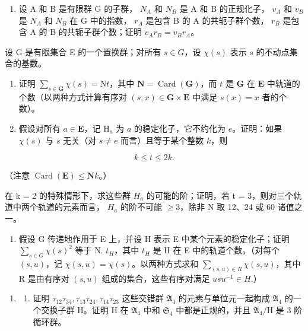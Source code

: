 \begin{enumerate}
\def\labelenumi{\arabic{enumi}。}
\setcounter{enumi}{7}
\tightlist
\item
  设 A 和 B 是有限群 G 的子群， \(N_{A}\) 和 \(N_{B}\) 是 A 和 B 的正规化子， \(v_{A}\) 和 \(v_{B}\) 是 \(N_{A}\) 和 \(N_{B}\) 在 G 中的指数， \(r_{A}\) 是包含 B 的 A 的共轭子群个数， \(r_{B}\) 是包含 A 的 B 的共轭子群个数；证明 \(v_{A}r_{B} = v_{B}r_{A}\)。
\end{enumerate}

设 G 是有限集合 E 的一个置换群；对所有 \(s \in G\)，设 \(\chi(s)\) 表示 \(s\) 的不动点集合的基数。

\begin{enumerate}
\def\labelenumi{(\alph{enumi})}
\item
  证明 \(\sum_{s\in \mathbf{G}}\chi (s) = \mathrm{N}t\)，其中 \(\mathbf{N} = \operatorname {Card}(\mathbf{G})\)，而 \(t\) 是 \(\mathbf{G}\) 在 \(\mathbf{E}\) 中轨道的个数（以两种方式计算有序对 \((s,x)\in \mathbf{G}\times \mathbf{E}\) 中满足 \(s(x) = x\) 者的个数）。
\item
  假设对所有 \(a \in \mathbf{E}\)，记 \(\mathrm{H}_a\) 为 \(a\) 的稳定化子，它不约化为 \(e\)。证明：如果 \(\chi(s)\) 与 \(s\) 无关（对 \(s \neq e\) 而言）且等于某个整数 \(k\)，则
\end{enumerate}

\[
k \leqslant t \leqslant 2 k.
\]

（注意 \(\operatorname{Card}(\mathbf{E}) \leqslant \mathbf{N}k\)。）

在 k = 2 的特殊情形下，求这些群 \(H_{a}\) 的可能的阶；证明，若 t = 3，则对三个轨道中两个轨道的元素而言， \(H_{a}\) 的阶不可能 \(\geqslant 3\)，除非 N 取 12、24 或 60 诸值之一。

\begin{enumerate}
\def\labelenumi{(\alph{enumi})}
\setcounter{enumi}{2}
\tightlist
\item
  假设 G 传递地作用于 E 上，并设 H 表示 E 中某个元素的稳定化子；证明 \(\sum_{s\in G}\chi(s)^{2}\) 等于 N. \(t_{H}\)，其中 \(t_{H}\) 是 H 在 E 中的轨道个数。（对每个 \((s,u)\)，记 \(\chi(s,u)=\chi(s)\)。以两种方式求和 \(\sum_{(s,u)\in R}\chi(s,u)\)，其中 R 是由有序对 \((s,u)\) 组成的集合，这些有序对满足 \(usu^{-1}\in H.\)）
\end{enumerate}

\begin{enumerate}
\def\labelenumi{\arabic{enumi}。}
\setcounter{enumi}{9}
\tightlist
\item
  \begin{enumerate}
  \def\labelenumii{(\alph{enumii})}
  \tightlist
  \item
    证明 \(\tau_{12}\tau_{34},\tau_{13}\tau_{24},\tau_{14}\tau_{23}\) 这些交错群 \(\mathfrak{A}_4\) 的元素与单位元一起构成 \(\mathfrak{A}_4\) 的一个交换子群 H。证明 H 在 \(\mathfrak{A}_4\) 中和 \(\mathfrak{S}_4\) 中都是正规的，并且 \(\mathfrak{A}_4 / \mathrm{H}\) 是 3 阶循环群。
  \end{enumerate}
\end{enumerate}


